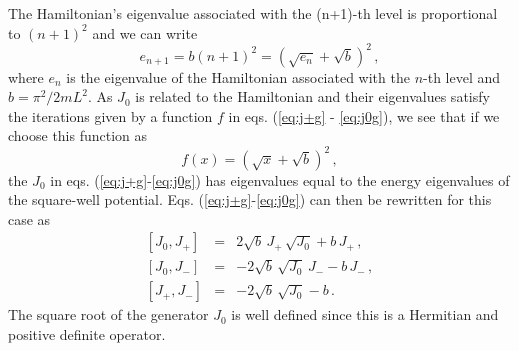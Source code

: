 \documentclass[a4paper,12pt]{article}
\begin{document}
The Hamiltonian's eigenvalue associated with the (n+1)-th level is 
proportional to $(n+1)^2$ and we can write
\begin{equation}
    e_{n+1} = b (n+1)^2 = ( \sqrt{e_{n}} + \sqrt{b} )^2 \, ,
    \label{eq:recorrencia}
\end{equation}
where $e_{n}$ is the eigenvalue of the Hamiltonian associated with 
the $n$-th level and $b= \pi^2/2mL^2$.  As $J_{0}$ is related to the 
Hamiltonian \cite{algebra1,algebra2} and their eigenvalues
satisfy the iterations given 
by a function $f$ in eqs. (\ref{eq:j+g} - \ref{eq:j0g}), we see that 
if we choose this function as
\begin{equation}
    f(x) = ( \sqrt{x} + \sqrt{b} )^2 \, ,  
    \label{eq:deff}
\end{equation}
the $J_0$ in eqs. (\ref{eq:j+g}-\ref{eq:j0g}) has eigenvalues
equal to the energy eigenvalues of the square-well potential. Eqs. 
(\ref{eq:j+g}-\ref{eq:j0g}) can then be rewritten 
for this case as 
\begin{eqnarray}
\left[ J_{0},J_{+} \right] &=& 2 \sqrt{b} \, J_{+} \, \sqrt{J_{0}} + b \, J_{+} \, , 
\label{eq:j+sw} \\
\left[ J_{0},J_{-} \right] &=& -2 \sqrt{b} \, \sqrt{J_{0}} \, J_{-}  - b \, J_{-} \, , 
\label{eq:j-sw} \\
\left[ J_{+},J_{-} \right] &=& -2 \sqrt{b} \, \sqrt{J_{0}} - b \, .
\label{eq:j0sw}
\end{eqnarray}
The square root of the generator $J_0$ is well defined since
this is a Hermitian and positive definite operator.
\end{document}
